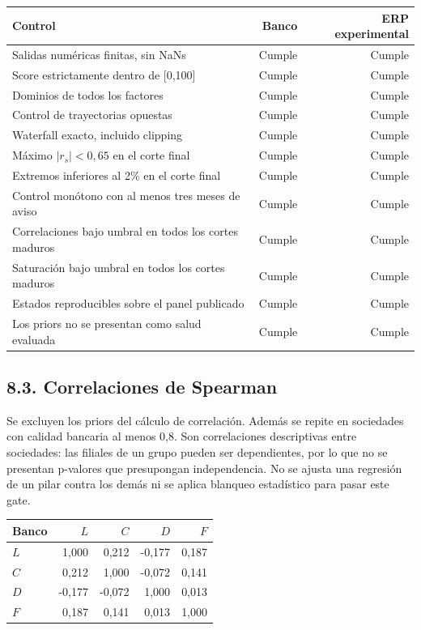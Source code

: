 \begin{center}
\small
\begin{tabular}{p{10cm}rr}
\hline
Control & Banco & ERP experimental \\
\hline
Salidas numéricas finitas, sin NaNs & Cumple & Cumple \\
Score estrictamente dentro de [0,100] & Cumple & Cumple \\
Dominios de todos los factores & Cumple & Cumple \\
Control de trayectorias opuestas & Cumple & Cumple \\
Waterfall exacto, incluido clipping & Cumple & Cumple \\
Máximo $|r_s|<0{,}65$ en el corte final & Cumple & Cumple \\
Extremos inferiores al 2\% en el corte final & Cumple & Cumple \\
Control monótono con al menos tres meses de aviso & Cumple & Cumple \\
Correlaciones bajo umbral en todos los cortes maduros & Cumple & Cumple \\
Saturación bajo umbral en todos los cortes maduros & Cumple & Cumple \\
Estados reproducibles sobre el panel publicado & Cumple & Cumple \\
Los priors no se presentan como salud evaluada & Cumple & Cumple \\
\hline
\end{tabular}
\end{center}

\subsection*{8.3. Correlaciones de Spearman}
Se excluyen los priors del cálculo de correlación. Además se repite en sociedades con calidad bancaria al menos 0,8. Son correlaciones descriptivas entre sociedades: las filiales de un grupo pueden ser dependientes, por lo que no se presentan p-valores que presupongan independencia. No se ajusta una regresión de un pilar contra los demás ni se aplica blanqueo estadístico para pasar este gate.

\begin{center}
\small
\begin{tabular}{lrrrr}
\hline
Banco & $L$ & $C$ & $D$ & $F$ \\
\hline
$L$ & 1,000 & 0,212 & -0,177 & 0,187 \\
$C$ & 0,212 & 1,000 & -0,072 & 0,141 \\
$D$ & -0,177 & -0,072 & 1,000 & 0,013 \\
$F$ & 0,187 & 0,141 & 0,013 & 1,000 \\
\hline
\end{tabular}
\end{center}

